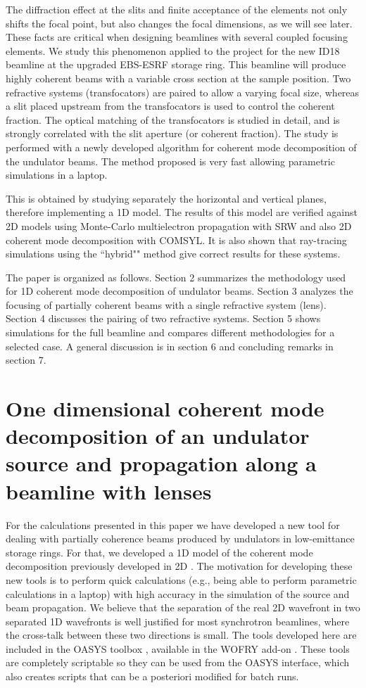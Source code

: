 \documentclass{iucr}              %
\begin{document}
The diffraction effect at the slits and finite acceptance of the elements not only shifts the focal point, but also changes the focal dimensions, as we will see later. These facts are critical when designing beamlines with several coupled focusing elements. We study this phenomenon applied to the project for the new ID18 beamline at the upgraded EBS-ESRF storage ring. This beamline will produce highly coherent beams with a variable cross section at the sample position. Two refractive systems (transfocators) are paired to allow a varying focal size, whereas a slit placed upstream from the transfocators is used to control the coherent fraction. The optical matching of the transfocators is studied in detail, and is strongly correlated with the slit aperture (or coherent fraction). The study is performed with a newly developed algorithm for coherent mode decomposition of the undulator beams. The method proposed is very fast allowing parametric simulations in a laptop.

This is obtained by studying separately the horizontal and vertical planes, therefore implementing a 1D model. The results of this model are verified against 2D models using Monte-Carlo multielectron propagation with SRW and also 2D coherent mode decomposition with COMSYL. It is also shown that ray-tracing simulations using the ``hybrid"" method \cite{codeHYBRID} give correct results for these systems. 

The paper is organized as follows. Section 2 summarizes the methodology used for 1D coherent mode decomposition of undulator beams. Section 3 analyzes the focusing of partially coherent beams with a single refractive system (lens). Section 4 discusses the pairing of two refractive systems. Section 5 shows simulations for the full beamline and compares different methodologies for a selected case. A general discussion is in section 6 and concluding remarks in section 7. 


\section{One dimensional coherent mode decomposition of an undulator source and propagation along a beamline with lenses}

For the calculations presented in this paper we have developed a new tool for dealing with partially coherence beams produced by undulators in low-emittance storage rings. For that, we developed a 1D model of the coherent mode decomposition previously developed in 2D \cite{glass2017}. The motivation for developing these new tools is to perform quick calculations (e.g., being able to perform parametric calculations in a laptop) with high accuracy in the simulation of the source and beam propagation. We believe that the separation of the real 2D wavefront in two separated 1D wavefronts is well justified for most synchrotron beamlines, where the cross-talk between these two directions is small. 
The tools developed here are included in the OASYS toolbox \cite{codeOASYS}, available in the WOFRY add-on \cite{XX}. These tools are completely scriptable so they can be used from the OASYS interface, which also creates scripts that can be a posteriori modified for batch runs. 
\end{document}

